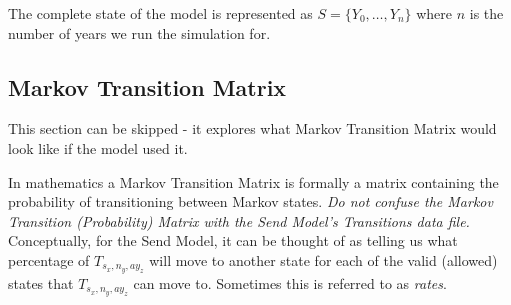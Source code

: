 \documentclass[margin=5mm]{article}
\begin{document}
The complete state of the model is represented as $S = \{Y_0, \dots,
Y_n\}$ where $n$ is the number of years we run the simulation for.

\subsection{Markov Transition Matrix}

This section can be skipped - it explores what Markov Transition
Matrix would look like if the model used it.

In mathematics a Markov Transition Matrix is formally a matrix
containing the probability of transitioning between Markov
states. \textit{Do not confuse the Markov Transition (Probability)
  Matrix with the Send Model's Transitions data file.}  Conceptually,
for the Send Model, it can be thought of as telling us what percentage
of $T_{s_x,n_y,ay_z}$ will move to another state \- for each of the
valid (allowed) states that $T_{s_x,n_y,ay_z}$ can move to.  Sometimes
this is referred to as \textit{rates}.
\end{document}

